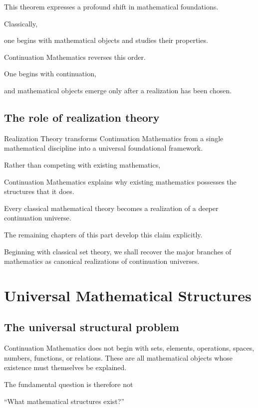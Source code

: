 \documentclass[13pt,openany]{book}
\theoremstyle{plain}
\theoremstyle{definition}
\begin{document}
This theorem expresses a profound shift in mathematical foundations.

Classically,

one begins with mathematical objects and studies their properties.

Continuation Mathematics reverses this order.

One begins with continuation,

and mathematical objects emerge only after a realization has been chosen.


\section{The role of realization theory}

Realization Theory transforms Continuation Mathematics from a single mathematical discipline into a universal foundational framework.

Rather than competing with existing mathematics,

Continuation Mathematics explains why existing mathematics possesses the structures that it does.

Every classical mathematical theory becomes a realization of a deeper continuation universe.

The remaining chapters of this part develop this claim explicitly.

Beginning with classical set theory, we shall recover the major branches of mathematics as canonical realizations of continuation universes.

\chapter{Universal Mathematical Structures}

\section{The universal structural problem}

Continuation Mathematics does not begin with sets, elements, operations,
spaces, numbers, functions, or relations. These are all mathematical
objects whose existence must themselves be explained.

The fundamental question is therefore not

\begin{center}
``What mathematical structures exist?''
\end{center}
\end{document}
